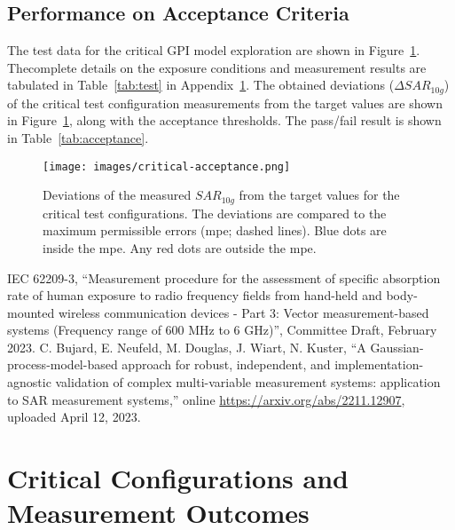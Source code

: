 \documentclass{article}
\begin{document}


\FloatBarrier
\subsection{Performance on Acceptance Criteria}
The test data for the critical GPI model exploration are shown in Figure~\ref{fig:critical-acc}. Thecomplete details on the exposure conditions and measurement results are tabulated in Table~\ref{tab:test} in Appendix~\ref{sec:critical-data}.
The obtained deviations ($\Delta SAR_{10g}$) of the critical test configuration measurements from the target values are shown in Figure~\ref{fig:critical-acc}, along with the acceptance thresholds. The pass/fail result is shown in Table~\ref{tab:acceptance}.



\begin{figure}[H] \centering
\texttt{[image: images/critical-acceptance.png]}
\caption{Deviations of the measured $SAR_{10g}$ from the target values for the critical test configurations. The deviations are compared to the maximum permissible errors (mpe; dashed lines). Blue dots are inside the mpe. Any red dots are outside the mpe.} \label{fig:critical-acc}
\end{figure}

\FloatBarrier

\newpage

\begin{thebibliography}{9}
IEC 62209-3, ``Measurement procedure for the assessment of specific absorption rate of human exposure to radio frequency fields from hand-held and body-mounted wireless communication devices - Part 3: Vector measurement-based systems (Frequency range of 600 MHz to 6 GHz)'', Committee Draft, February 2023.
C. Bujard, E. Neufeld, M. Douglas, J. Wiart, N. Kuster, ``A Gaussian-process-model-based approach for robust, independent, and implementation-agnostic validation of complex multi-variable measurement systems: application to SAR measurement systems,'' online \url{https://arxiv.org/abs/2211.12907}, uploaded April 12, 2023.
\end{thebibliography}

\FloatBarrier
\newpage
\appendix
\section{Critical Configurations and Measurement Outcomes} \label{sec:critical-data}


\end{document}
